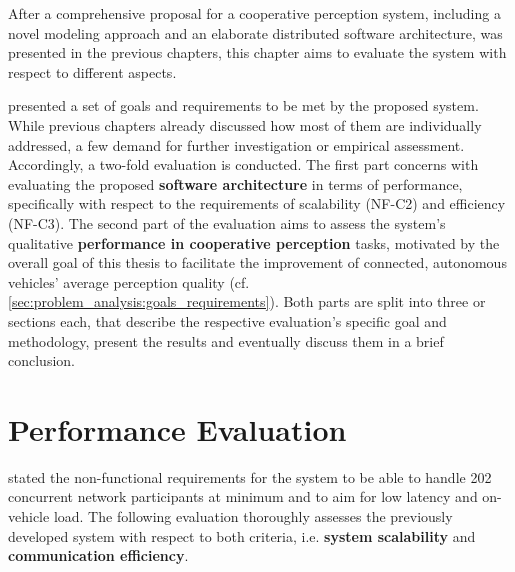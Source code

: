 After a comprehensive proposal for a cooperative perception system, including a novel modeling approach and an elaborate distributed software architecture, was presented in the previous chapters, this chapter aims to evaluate the system with respect to different aspects.

 presented a set of goals and requirements to be met by the proposed system. While previous chapters already discussed how most of them are individually addressed, a few demand for further investigation or empirical assessment. Accordingly, a two-fold evaluation is conducted. The first part concerns with evaluating the proposed \textbf{software architecture} in terms of performance, specifically with respect to the requirements of scalability (NF-C2) and efficiency (NF-C3). The second part of the evaluation aims to assess the system's qualitative \textbf{performance in cooperative perception} tasks, motivated by the overall goal of this thesis to facilitate the improvement of connected, autonomous vehicles' average perception quality (cf. \cref{sec:problem_analysis:goals_requirements}). Both parts are split into three or sections each, that describe the respective evaluation's specific goal and methodology, present the results and eventually discuss them in a brief conclusion.

\section{Performance Evaluation}
\label{sec:evaluation:performance_evaluation}
 stated the non-functional requirements for the system to be able to handle 202 concurrent network participants at minimum and to aim for low latency and on-vehicle load. The following evaluation thoroughly assesses the previously developed system with respect to both criteria, i.e. \textbf{system scalability} and \textbf{communication efficiency}.

